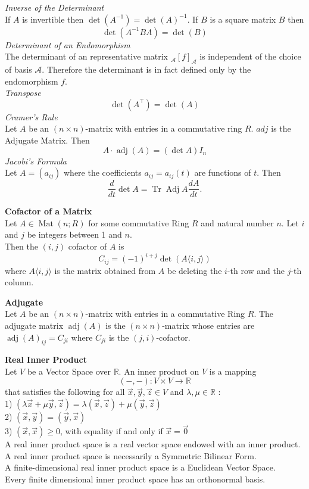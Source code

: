 \documentclass[a4paper, 10pt]{article}
\begin{document}
\begin{multicols*}{3}
\textit{Inverse of the Determinant}\\
If $A$ is invertible then $\operatorname{det}\left(A^{-1}\right)=\operatorname{det}(A)^{-1}$. 
If $B$ is a square matrix $B$ then
\[
\operatorname{det}\left(A^{-1} B A\right)=\operatorname{det}(B)
\]
\textit{Determinant of an Endomorphism}\\
The determinant of an representative matrix ${ }_{\mathcal{A}}[f]_{\mathcal{A}}$ is independent of the choice of basis $\mathcal{A}$. Therefore the determinant is in fact defined only by the endomorphism $f$. \\
\textit{Transpose}
\[
\operatorname{det}\left(A^{\top}\right)=\operatorname{det}(A)
\]
\textit{Cramer's Rule}\\
Let $A$ be an $(n \times n)$-matrix with entries in a commutative ring $R$. $adj$ is the Adjugate Matrix. Then
\[
A \cdot \operatorname{adj}(A)=(\operatorname{det} A) I_n
\]
\textit{Jacobi's Formula}\\
Let $A=\left(a_{i j}\right)$ where the coefficients $a_{i j}=a_{i j}(t)$ are functions of $t$. Then
\[
\frac{d}{d t} \operatorname{det} A=\operatorname{Tr} \operatorname{Adj} A \frac{d A}{d t} .
\]

\textbf{Cofactor of a Matrix}\\
Let $A \in \operatorname{Mat}(n ; R)$ for some commutative Ring $R$ and natural number $n$. Let $i$ and $j$ be integers between 1 and $n$. \\
Then the $(i, j)$ cofactor of $A$ is $$C_{i j}=(-1)^{i+j} \operatorname{det}(A\langle i, j\rangle)$$ where $A\langle i, j\rangle$ is the matrix obtained from $A$ be deleting the $i$-th row and the $j$-th column.

\textbf{Adjugate}\\
Let $A$ be an $(n \times n)$-matrix with entries in a commutative Ring $R$. 
The adjugate matrix $\operatorname{adj}(A)$ is the $(n \times n)$-matrix whose entries are $\operatorname{adj}(A)_{i j}=C_{j i}$ where $C_{j i}$ is the $(j, i)$-cofactor.

\textbf{Real Inner Product}\\
Let $V$ be a Vector Space over $\mathbb{R}$. An inner product on $V$ is a mapping
$$
(-,-): V \times V \rightarrow \mathbb{R}
$$
that satisfies the following for all $\vec{x}, \vec{y}, \vec{z} \in V$ and $\lambda, \mu \in \mathbb{R}$ :\\
1) $(\lambda \vec{x}+\mu \vec{y}, \vec{z})=\lambda(\vec{x}, \vec{z})+\mu(\vec{y}, \vec{z})$\\
2) $(\vec{x}, \vec{y})=(\vec{y}, \vec{x})$\\
3) $(\vec{x}, \vec{x}) \geqslant 0$, with equality if and only if $\vec{x}=\overrightarrow{0}$\\
A real inner product space is a real vector space endowed with an inner product.\\
A real inner product space is necessarily a Symmetric Bilinear Form.\\
A finite-dimensional real inner product space is a Euclidean Vector Space.\\
Every finite dimensional inner product space has an orthonormal basis. \\


\end{multicols*}
\end{document}
